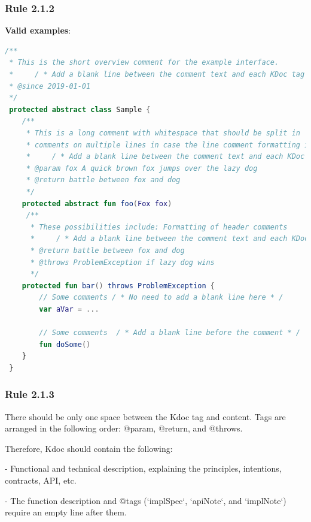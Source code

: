 \subsubsection*{\textbf{Rule 2.1.2}}
\leavevmode\newline



\textbf{Valid examples}:



\begin{lstlisting}[language=Kotlin]
/**
 * This is the short overview comment for the example interface.
 *     / * Add a blank line between the comment text and each KDoc tag underneath * /
 * @since 2019-01-01
 */
 protected abstract class Sample {
    /**
     * This is a long comment with whitespace that should be split in
     * comments on multiple lines in case the line comment formatting is enabled.
     *     / * Add a blank line between the comment text and each KDoc tag underneath * /
     * @param fox A quick brown fox jumps over the lazy dog
     * @return battle between fox and dog
     */
    protected abstract fun foo(Fox fox)
     /**
      * These possibilities include: Formatting of header comments
      *     / * Add a blank line between the comment text and each KDoc tag underneath * /
      * @return battle between fox and dog
      * @throws ProblemException if lazy dog wins
      */
    protected fun bar() throws ProblemException {
        // Some comments / * No need to add a blank line here * /
        var aVar = ...

        // Some comments  / * Add a blank line before the comment * /
        fun doSome()
    }
 }
\end{lstlisting}


\subsubsection*{\textbf{Rule 2.1.3}}
\leavevmode\newline

There should be only one space between the Kdoc tag and content. Tags are arranged in the following order: @param, @return, and @throws.



Therefore, Kdoc should contain the following:

- Functional and technical description, explaining the principles, intentions, contracts, API, etc.

- The function description and @tags (`implSpec`, `apiNote`, and `implNote`) require an empty line after them.

